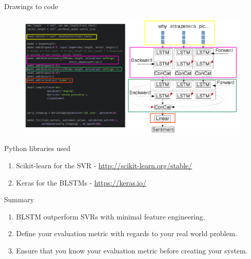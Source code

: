 \documentclass[10pt]{beamer}
\begin{document}
\begin{frame}[fragile]{Drawings to code}
\begin{figure}
\includegraphics[scale=0.3]{lstm_code_to_diagram.png}
\end{figure}
\end{frame}

\begin{frame}[fragile]{Python libraries used}
\begin{enumerate}
\item Scikit-learn for the SVR - \url{http://scikit-learn.org/stable/}
\item Keras for the BLSTMs - \url{https://keras.io/}
\end{enumerate}

\end{frame}

\begin{frame}[fragile]{Summary}
\begin{enumerate}
\item BLSTM outperform SVRs with minimal feature engineering.
\item Define your evaluation metric with regards to your real world problem.
\item Ensure that you know your evaluation metric before creating your system.
\end{enumerate}

\end{frame}
\end{document}
